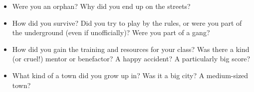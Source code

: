 \begin{itemize}
	\item Were you an orphan? Why did you end up on the streets?
	\item How did you survive? Did you try to play by the rules, or were you part of the underground (even if unofficially)? Were you part of a gang?
	\item How did you gain the training and resources for your class? Was there a kind (or cruel!) mentor or benefactor? A happy accident? A particularly big score?
	\item What kind of a town did you grow up in? Was it a big city? A medium-sized town?
\end{itemize}